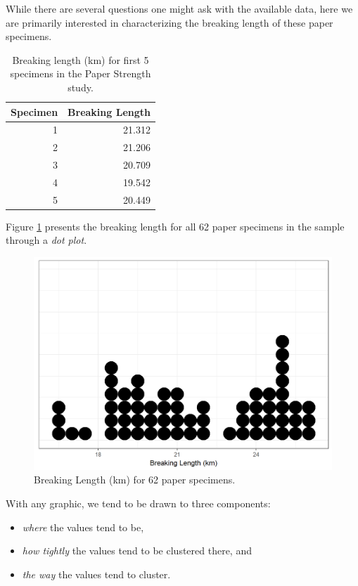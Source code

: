 \documentclass[]{book}
\providecommand{\tightlist}{%
  \setlength{\itemsep}{0pt}\setlength{\parskip}{0pt}}
\theoremstyle{definition}
\theoremstyle{definition}
\theoremstyle{definition}
\theoremstyle{remark}
\begin{document}
While there are several questions one might ask with the available data,
here we are primarily interested in characterizing the breaking length
of these paper specimens.

\begin{table}

\caption{\label{tab:summaries-paper-table}Breaking length (km) for first 5 specimens in the Paper Strength study.}
\centering
\begin{tabular}[t]{r|r}
\hline
Specimen & Breaking Length\\
\hline
1 & 21.312\\
\hline
2 & 21.206\\
\hline
3 & 20.709\\
\hline
4 & 19.542\\
\hline
5 & 20.449\\
\hline
\end{tabular}
\end{table}

Figure \ref{fig:summaries-paper-dotplot} presents the breaking length
for all 62 paper specimens in the sample through a \emph{dot plot}.

\begin{figure}

{\centering \includegraphics[width=0.8\linewidth]{./Images/summaries-paper-dotplot-1} 

}

\caption{Breaking Length (km) for 62 paper specimens.}\label{fig:summaries-paper-dotplot}
\end{figure}

With any graphic, we tend to be drawn to three components:

\begin{itemize}
\tightlist
\item
  \emph{where} the values tend to be,
\item
  \emph{how tightly} the values tend to be clustered there, and
\item
  \emph{the way} the values tend to cluster.
\end{itemize}
\end{document}
